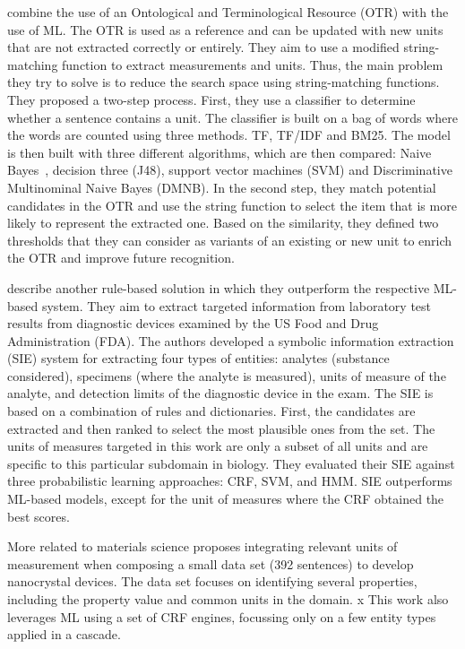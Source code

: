 \cite{berrahou2013extract} combine the use of an Ontological and
Terminological Resource (OTR) with the use of ML.
The OTR is used as a reference and can be updated with new units that are not extracted correctly or entirely. 
They aim to use a modified string-matching function to extract measurements and units. Thus, the main problem they try to solve is to reduce the search space using string-matching functions. 
They proposed a two-step process. 
First, they use a classifier to determine whether a sentence contains a unit. The classifier is built on a bag of words where the words are counted using three methods. TF, TF/IDF and BM25. The model is then built with three different algorithms, which are then compared: Naive Bayes~\cite{john2013estimating}, decision three (J48), support vector machines (SVM) and Discriminative Multinominal Naive Bayes (DMNB).
In the second step, they match potential candidates in the OTR and use the string function to select the item that is more likely to represent the extracted one. Based on the similarity, they defined two thresholds that they can consider as variants of an existing or new unit to enrich the OTR and improve future recognition.

\cite{kang_extracting_2013} describe another rule-based solution in which they outperform the respective ML-based system. 
They aim to extract targeted information from laboratory test results from diagnostic devices examined by the US Food and Drug Administration (FDA). 
The authors developed a symbolic information extraction (SIE) system for extracting four types of entities: analytes (substance considered), specimens (where the analyte is measured), units of measure of the analyte, and detection limits of the diagnostic device in the exam.
The SIE is based on a combination of rules and dictionaries. First, the candidates are extracted and then ranked to select the most plausible ones from the set. The units of measures targeted in this work are only a subset of all units and are specific to this particular subdomain in biology. 
They evaluated their SIE against three probabilistic learning approaches: CRF, SVM, and HMM. SIE outperforms ML-based models, except for the unit of measures where the CRF obtained the best scores. 

More related to materials science \cite{dieb2015framework} proposes integrating relevant units of measurement when composing a small data set (392 sentences) to develop nanocrystal devices. 
The data set focuses on identifying several properties, including the property value and common units in the domain. x
This work also leverages ML using a set of CRF engines, focussing only on a few entity types applied in a cascade. 

